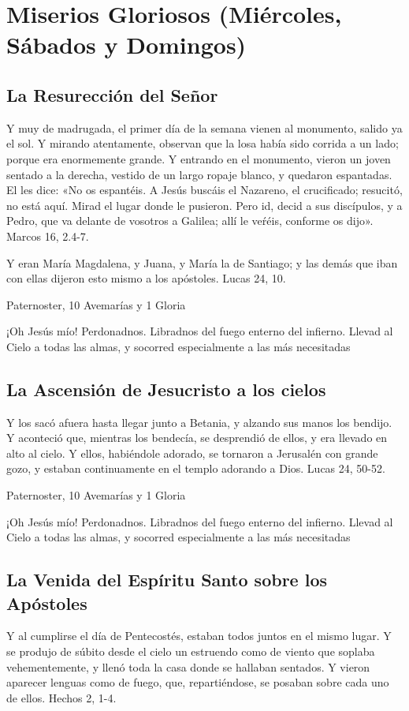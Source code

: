 \documentclass[a4paper,11pt, oneside]{report}
\begin{document}
\section*{Miserios Gloriosos (Miércoles, Sábados y Domingos)}\label{sec:gloriosos}
{
  \subsection*{La Resurección del Señor}
    Y muy de madrugada, el primer día de la semana vienen al monumento, salido ya el sol. Y mirando atentamente, observan que la losa había
    sido corrida a un lado; porque era enormemente grande. Y entrando en el monumento, vieron un joven sentado a la derecha, vestido de un largo
    ropaje blanco, y quedaron espantadas. El les dice: «No os espantéis. A Jesús buscáis el Nazareno, el crucificado; resucitó, no está aquí. Mirad
    el lugar donde le pusieron. Pero id, decid a sus discípulos, y a Pedro, que va delante de vosotros a Galilea; allí le veŕéis, conforme os dijo».
    Marcos 16, 2.4-7.

    \medskip
    Y eran María Magdalena, y Juana, y María la de Santiago; y las demás que iban con ellas dijeron esto mismo a los apóstoles. 
    Lucas 24, 10.

     Paternoster, 10 Avemarías y 1 Gloria
    
    \medskip
    ¡Oh Jesús mío! Perdonadnos. Libradnos del fuego enterno del infierno. Llevad al Cielo a todas las almas, y socorred especialmente a las más 
    necesitadas
  
  \subsection*{La Ascensión de Jesucristo a los cielos}
    Y los sacó afuera hasta llegar junto a Betania, y alzando sus manos los bendijo. Y aconteció que, mientras los bendecía, se desprendió de ellos,
    y era llevado en alto al cielo. Y ellos, habiéndole adorado, se tornaron a Jerusalén con grande gozo, y estaban continuamente en el templo
    adorando a Dios. Lucas 24, 50-52.

     Paternoster, 10 Avemarías y 1 Gloria
    
    \medskip
    ¡Oh Jesús mío! Perdonadnos. Libradnos del fuego enterno del infierno. Llevad al Cielo a todas las almas, y socorred especialmente a las más 
    necesitadas
    
  \subsection*{La Venida del Espíritu Santo sobre los Apóstoles}
    Y al cumplirse el día de Pentecostés, estaban todos juntos en el mismo lugar. Y se produjo de súbito desde el cielo un estruendo como de viento
    que soplaba vehementemente, y llenó toda la casa donde se hallaban sentados. Y vieron aparecer lenguas como de fuego, que, repartiéndose, se 
    posaban sobre cada uno de ellos. Hechos 2, 1-4.

}
\end{document}
